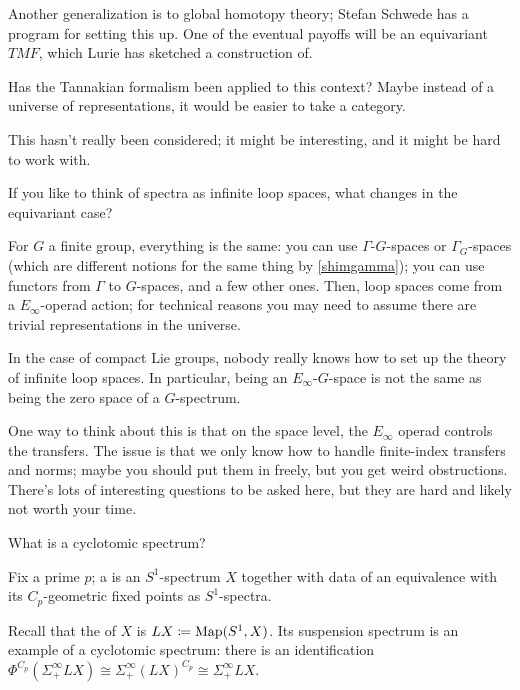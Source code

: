 Another generalization is to global homotopy theory; Stefan Schwede has a program for setting this up. One of the
eventual payoffs will be an equivariant $\mathit{TMF}$, which Lurie has sketched a construction of.
\begin{ques}
Has the Tannakian formalism been applied to this context? Maybe instead of a universe of representations, it would
be easier to take a category.
\end{ques}
This hasn't really been considered; it might be interesting, and it might be hard to work with.

\begin{ques}
If you like to think of spectra as infinite loop spaces, what changes in the equivariant case?
\end{ques}
For $G$ a finite group, everything is the same: you can use $\Gamma$-$G$-spaces or $\Gamma_G$-spaces (which are
different notions for the same thing by \cref{shimgamma}); you can use functors from $\Gamma$ to $G$-spaces, and a
few other ones. Then, loop spaces come from a $E_\infty$-operad action; for technical reasons you may need to
assume there are trivial representations in the
universe.

In the case of compact Lie groups, nobody really knows how to set up the theory of infinite loop spaces. In
particular, being an $E_\infty$-$G$-space is not the same as being the zero space of a $G$-spectrum.

One way to think about this is that on the space level, the $E_\infty$ operad controls the transfers. The issue is
that we only know how to handle finite-index transfers and norms; maybe you should put them in freely, but you get
weird obstructions. There's lots of interesting questions to be asked here, but they are hard and likely not worth
your time.
\begin{ques}
What is a cyclotomic spectrum?
\end{ques}
Fix a prime $p$; a  is an $S^1$-spectrum $X$ together with data of an equivalence
with its $C_p$-geometric fixed points as $S^1$-spectra.

Recall that the  of $X$ is $LX\coloneqq\operatorname{Map}(S^1,X)$. Its suspension spectrum is an example of a
cyclotomic spectrum: there is an identification $\Phi^{C_p}(\Sigma_+^\infty LX)\cong\Sigma_+^\infty (LX)^{C_p}\cong
\Sigma_+^\infty LX$.

